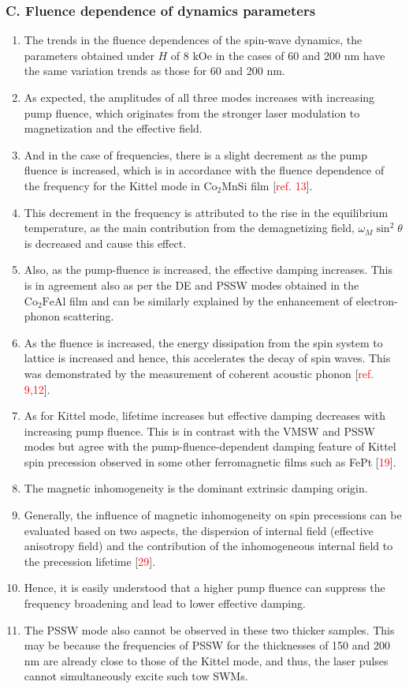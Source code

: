 \subsubsection*{C. Fluence dependence of dynamics parameters}
\begin{enumerate}
    \item The trends in the fluence dependences of the spin-wave dynamics, the parameters obtained under $H$ of 8 kOe in the cases of 60 and 200 nm have the same variation trends as those for 60 and 200 nm.
    \item As expected, the amplitudes of all three modes increases with increasing pump fluence, which originates from the stronger laser modulation to magnetization and the effective field.
    \item And in the case of frequencies, there is a slight decrement as the pump fluence is increased, which is in accordance with the fluence dependence of the frequency for the Kittel mode in $\mathrm{Co_2MnSi}$ film [\textcolor{red}{ref. 13}].
    \item This decrement in the frequency is attributed to the rise in the equilibrium temperature, as the main contribution from the demagnetizing field, $\omega_M \sin^2\theta$ is decreased and cause this effect.
    \item Also, as the pump-fluence is increased, the effective damping increases. This is in agreement also as per the DE and PSSW modes obtained in the $\mathrm{Co_2FeAl}$ film and can be similarly explained by the enhancement of electron-phonon scattering.
    \item As the fluence is increased, the energy dissipation from the spin system to lattice is increased and hence, this accelerates the decay of spin waves. This was demonstrated by the measurement of coherent acoustic phonon [\textcolor{red}{ref. 9,12}].
    \item As for Kittel mode, lifetime increases but effective damping decreases with increasing pump fluence. This is in contrast with the VMSW and PSSW modes but agree with the pump-fluence-dependent damping feature of Kittel spin precession observed in some other ferromagnetic films such as FePt [\textcolor{red}{19}].
    \item The magnetic inhomogeneity is the dominant extrinsic damping origin.
    \item Generally, the influence of magnetic inhomogeneity on spin precessions can be evaluated based on two aspects, the dispersion of internal field (effective anisotropy field) and the contribution of the inhomogeneous internal field to the precession lifetime [\textcolor{red}{29}].
    \item Hence, it is easily understood that a higher pump fluence can suppress the frequency broadening and lead to lower effective damping.
    \item The PSSW mode also cannot be observed in these two thicker samples. This may be because the frequencies of PSSW for the thicknesses of 150 and 200 nm are already close to those of the Kittel mode, and thus, the laser pulses cannot simultaneously excite such tow SWMs.
\end{enumerate}